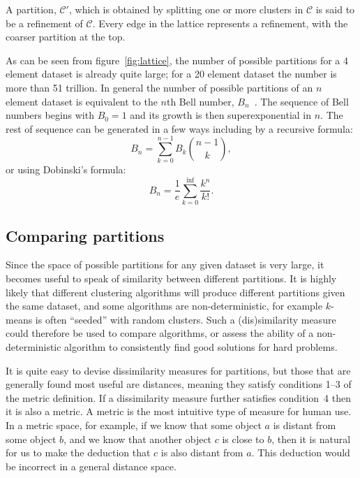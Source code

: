 \documentclass[a4paper]{report}
\newcommand{\clus}{\mathcal{C}}
\begin{document}
A partition, $\clus'$, which is obtained by splitting one or more clusters in
$\clus$ is said to be a refinement of $\clus$.  Every edge in the lattice
represents a refinement, with the coarser partition at the top.

As can be seen from figure~\ref{fig:lattice}, the number of possible
partitions for a 4 element dataset is already quite large; for a 20 element
dataset the number is more than 51 trillion.  In general the number of
possible partitions of an $n$ element dataset is equivalent to the $n$th Bell
number, $B_n$~\citep{bell1934exponential}.  The sequence of Bell numbers
begins with $B_0 = 1$ and its growth is then superexponential in $n$.  The
rest of sequence can be generated in a few ways including by a recursive
formula:
\begin{equation*}
  B_n = \sum_{k=0}^{n-1} B_k {n-1 \choose k},
\end{equation*}
or using Dobinski's formula:
\begin{equation*}
  B_n = \frac{1}{e} \sum_{k=0}^{\inf} \frac{k^n}{k!}.
\end{equation*}

\subsection{Comparing partitions}
\label{sec:comparing-partitions}

Since the space of possible partitions for any given dataset is very large, it
becomes useful to speak of similarity between different partitions.  It is
highly likely that different clustering algorithms will produce different
partitions given the same dataset, and some algorithms are non-deterministic,
for example $k$-means is often ``seeded'' with random clusters.  Such a
(dis)similarity measure could therefore be used to compare algorithms, or
assess the ability of a non-deterministic algorithm to consistently find good
solutions for hard problems.

It is quite easy to devise dissimilarity measures for partitions, but those
that are generally found most useful are distances, meaning they satisfy
conditions 1--3 of the metric definition.  If a dissimilarity measure further
satisfies condition~4 then it is also a metric.  A metric is the most
intuitive type of measure for human use.  In a metric space, for example, if
we know that some object $a$ is distant from some object $b$, and we know that
another object $c$ is close to $b$, then it is natural for us to make the
deduction that $c$ is also distant from $a$.  This deduction would be
incorrect in a general distance space.
\end{document}
